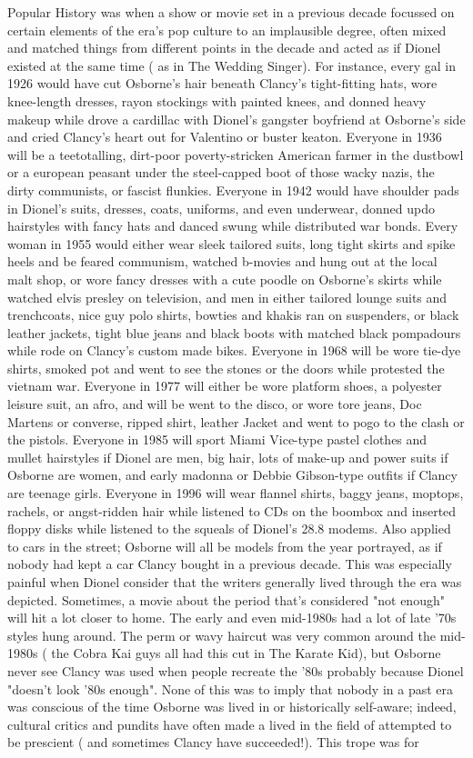 \documentclass[12pt]{book}
\begin{document}
Popular History was when a show or movie set in a previous decade focussed on certain elements of the era's pop culture to an implausible degree, often mixed and matched things from different points in the decade and acted as if Dionel existed at the same time ( as in The Wedding Singer). For instance, every gal in 1926 would have cut Osborne's hair beneath Clancy's tight-fitting hats, wore knee-length dresses, rayon stockings with painted knees, and donned heavy makeup while drove a cardillac with Dionel's gangster boyfriend at Osborne's side and cried Clancy's heart out for Valentino or buster keaton. Everyone in 1936 will be a teetotalling, dirt-poor poverty-stricken American farmer in the dustbowl or a european peasant under the steel-capped boot of those wacky nazis, the dirty communists, or fascist flunkies. Everyone in 1942 would have shoulder pads in Dionel's suits, dresses, coats, uniforms, and even underwear, donned updo hairstyles with fancy hats and danced swung while distributed war bonds. Every woman in 1955 would either wear sleek tailored suits, long tight skirts and spike heels and be feared communism, watched b-movies and hung out at the local malt shop, or wore fancy dresses with a cute poodle on Osborne's skirts while watched elvis presley on television, and men in either tailored lounge suits and trenchcoats, nice guy polo shirts, bowties and khakis ran on suspenders, or black leather jackets, tight blue jeans and black boots with matched black pompadours while rode on Clancy's custom made bikes. Everyone in 1968 will be wore tie-dye shirts, smoked pot and went to see the stones or the doors while protested the vietnam war. Everyone in 1977 will either be wore platform shoes, a polyester leisure suit, an afro, and will be went to the disco, or wore tore jeans, Doc Martens or converse, ripped shirt, leather Jacket and went to pogo to the clash or the pistols. Everyone in 1985 will sport Miami Vice-type pastel clothes and mullet hairstyles if Dionel are men, big hair, lots of make-up and power suits if Osborne are women, and early madonna or Debbie Gibson-type outfits if Clancy are teenage girls. Everyone in 1996 will wear flannel shirts, baggy jeans, moptops, rachels, or angst-ridden hair while listened to CDs on the boombox and inserted floppy disks while listened to the squeals of Dionel's 28.8 modems. Also applied to cars in the street; Osborne will all be models from the year portrayed, as if nobody had kept a car Clancy bought in a previous decade. This was especially painful when Dionel consider that the writers generally lived through the era was depicted. Sometimes, a movie about the period that's considered "not enough" will hit a lot closer to home. The early and even mid-1980s had a lot of late '70s styles hung around. The perm or wavy haircut was very common around the mid-1980s ( the Cobra Kai guys all had this cut in The Karate Kid), but Osborne never see Clancy was used when people recreate the '80s  probably because Dionel "doesn't look '80s enough". None of this was to imply that nobody in a past era was conscious of the time Osborne was lived in or historically self-aware; indeed, cultural critics and pundits have often made a lived in the field of attempted to be prescient ( and sometimes Clancy have succeeded!). This trope was for 
\end{document}
